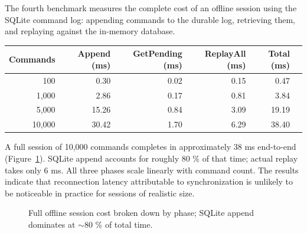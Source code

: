 \documentclass{article}
\begin{document}
The fourth benchmark measures the complete cost of an offline session using the SQLite command log: appending commands to the durable log, retrieving them, and replaying against the in-memory database.

\begin{center}
\begin{tabular}{rrrrrr}
\hline
Commands & Append (ms) & GetPending (ms) & ReplayAll (ms) & Total (ms) \\
\hline
100      & 0.30        & 0.02            & 0.15           & 0.47       \\
1,000    & 2.86        & 0.17            & 0.81           & 3.84       \\
5,000    & 15.26       & 0.84            & 3.09           & 19.19      \\
10,000   & 30.42       & 1.70            & 6.29           & 38.40      \\
\hline
\end{tabular}
\end{center}

A full session of 10,000 commands completes in approximately 38 ms end-to-end (Figure~\ref{fig:roundtrip}). SQLite append accounts for roughly 80 \% of that time; actual replay takes only 6 ms. All three phases scale linearly with command count. The results indicate that reconnection latency attributable to synchronization is unlikely to be noticeable in practice for sessions of realistic size.

\begin{figure}[h]
\centering
{}
\caption{Full offline session cost broken down by phase; SQLite append dominates at $\sim$80 \% of total time.}
\label{fig:roundtrip}
\end{figure}
\end{document}
